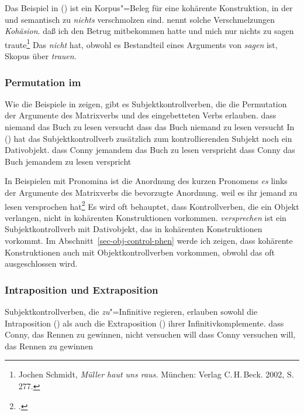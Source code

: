 Das Beispiel in () ist ein Korpus"=Beleg für eine kohärente Konstruktion, in der
 und  semantisch zu \emph{nichts} verschmolzen sind.
\citet[{\S}\,80]{Bech55a} nennt solche Verschmelzungen \emph{Kohäsion}.
\ea{}
\label{bsp-trauen-kohaerent}
daß ich den Betrug mitbekommen hatte und mich nur nichts zu sagen traute\footnote{
        Jochen Schmidt, \emph{Müller haut uns raus.} München: Verlag C.\,H.\,Beck. 2002, S.\,277.%
}
\z
Das \emph{nicht} hat, obwohl es Bestandteil eines Arguments von \emph{sagen} ist,
Skopus über \emph{trauen}.


\subsubsection{Permutation im \mf}
\label{sec-subj-contr-perm-mf}

Wie die Beispiele in  zeigen, gibt es Subjektkontrollverben, die die Permutation
der Argumente des Matrixverbs und des eingebetteten Verbs erlauben.
\eal
\ex dass niemand das Buch zu lesen versucht
\ex dass das Buch niemand zu lesen versucht
\zl
In () hat das Subjektkontrollverb zusätzlich zum kontrollierenden Subjekt noch ein Dativobjekt.
\eal{}
\ex dass Conny jemandem das Buch zu lesen verspricht
\ex dass Conny das Buch jemandem zu lesen verspricht
\zl

\noindent
In Beispielen mit Pronomina ist die Anordnung des kurzen Pronomens \emph{es}
links der Argumente des Matrixverbs die bevorzugte Anordnung.
\ea
\label{ex-weil-es-ihr-jemand-zu-lesen-versprochen-hat-zwei}
weil    es       ihr       jemand   zu lesen versprochen hat\footnote{
\textcites[]{Haider86c}[]{Haider90b}.
}
\z
Es wird oft behauptet, dass Kontrollverben, die ein Objekt verlangen, nicht in kohärenten
Konstruktionen vorkommen.
\emph{versprechen} ist ein Subjektkontrollverb mit Dativobjekt, das
in kohärenten Konstruktionen vorkommt.
Im Abschnitt~\ref{sec-obj-control-phen} werde ich zeigen, dass kohärente Konstruktionen
auch mit Objektkontrollverben vorkommen, obwohl das oft ausgeschlossen wird.

\subsubsection{Intraposition und Extraposition}
\label{sec-subj-contr-ie}

Subjektkontrollverben, die \emph{zu}"=Infinitive regieren, 
erlauben sowohl die Intraposition () als auch die Extraposition
() ihrer Infinitivkomplemente.
\ea
dass Conny, das Rennen zu gewinnen, nicht versuchen will
\z
\ea
dass    Conny versuchen will,    das Rennen zu gewinnen
\z
{}%

